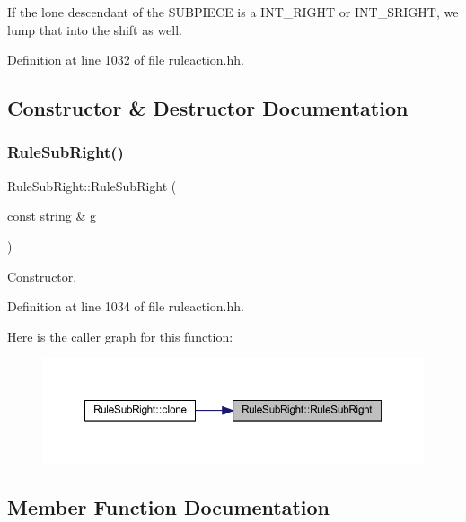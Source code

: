If the lone descendant of the S\+U\+B\+P\+I\+E\+CE is a I\+N\+T\+\_\+\+R\+I\+G\+HT or I\+N\+T\+\_\+\+S\+R\+I\+G\+HT, we lump that into the shift as well. 

Definition at line 1032 of file ruleaction.\+hh.



\subsection{Constructor \& Destructor Documentation}
\mbox{\label{class_rule_sub_right_a3a3120b841b557dec91ccb845bb46ce6}} 
\subsubsection{\texorpdfstring{RuleSubRight()}{RuleSubRight()}}
{\footnotesize\ttfamily Rule\+Sub\+Right\+::\+Rule\+Sub\+Right (\begin{DoxyParamCaption}\item[{const string \&}]{g }\end{DoxyParamCaption})\hspace{0.3cm}{\ttfamily [inline]}}



\mbox{\hyperlink{class_constructor}{Constructor}}. 



Definition at line 1034 of file ruleaction.\+hh.

Here is the caller graph for this function\+:
\nopagebreak
\begin{figure}[H]
\begin{center}
\leavevmode
\includegraphics[width=350pt]{class_rule_sub_right_a3a3120b841b557dec91ccb845bb46ce6_icgraph}
\end{center}
\end{figure}


\subsection{Member Function Documentation}
\mbox{\label{class_rule_sub_right_a41e3a0031c161d828b8a32239d2c965e}} 
